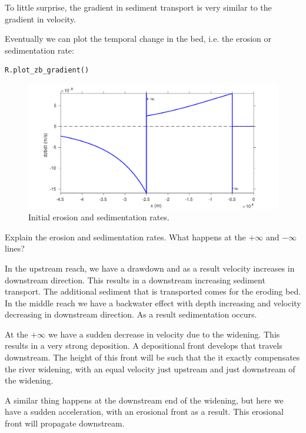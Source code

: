 \documentclass[a4paper]{article}
\begin{document}
To little surprise, the gradient in sediment transport is very similar to the gradient in velocity.

Eventually we can plot the temporal change in the bed, i.e. the erosion or sedimentation rate:

\begin{lstlisting}
R.plot_zb_gradient()
\end{lstlisting}

\begin{figure}[ht]
  \centering
  \includegraphics[width=\linewidth]{matlab/zbgrad_widening.pdf}
  \caption{Initial erosion and sedimentation rates.}
  \label{fig:zbgrad_widening}
\end{figure}

\begin{exercise}
  Explain the erosion and sedimentation rates. What happens at the $+\infty$ and $-\infty$ lines?
\end{exercise}

\begin{solution}
  In the upstream reach, we have a drawdown and as a result velocity increases in downstream direction. This results in a downstream increasing sediment transport. The additional sediment that is transported comes for the eroding bed. In the middle reach we have a backwater effect with depth increasing and velocity decreasing in downstream direction. As a result sedimentation occurs.
  
  At the $+\infty$ we have a sudden decrease in velocity due to the widening. This results in a very strong deposition. A depositional front develops that travels downstream. The height of this front will be such that the it exactly compensates the river widening, with an equal velocity just upstream and just downstream of the widening.
  
  A similar thing happens at the downstream end of the widening, but here we have a sudden acceleration, with an erosional front as a result. This erosional front will propagate downstream.
\end{solution}
\end{document}
